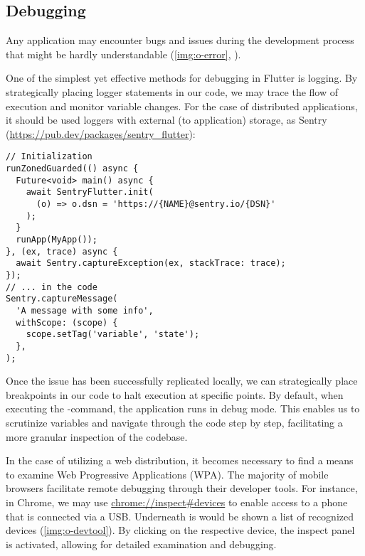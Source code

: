
\subsection{Debugging}

Any application may encounter bugs and issues during the development process that might be hardly understandable 
(\cref{img:o-error}, ).


\noindent One of the simplest yet effective methods for debugging in Flutter is logging. By strategically placing logger 
statements in our code, we may trace the flow of execution and monitor variable changes. For the case of distributed 
applications, it should be used loggers with external (to application) storage, as Sentry
(\href{https://pub.dev/packages/sentry\_flutter}{https://pub.dev/packages/sentry\_flutter}):

\begin{lstlisting}
// Initialization
runZonedGuarded(() async {
  Future<void> main() async {
    await SentryFlutter.init(
      (o) => o.dsn = 'https://{NAME}@sentry.io/{DSN}'
    );
  }
  runApp(MyApp());
}, (ex, trace) async {
  await Sentry.captureException(ex, stackTrace: trace);
});
// ... in the code
Sentry.captureMessage(
  'A message with some info',
  withScope: (scope) {
    scope.setTag('variable', 'state');
  },
);
\end{lstlisting}

\noindent Once the issue has been successfully replicated locally, we can strategically place breakpoints in our code 
to halt execution at specific points. By default, when executing the -command, the application runs in 
debug mode. This enables us to scrutinize variables and navigate through the code step by step, facilitating a more 
granular inspection of the codebase.

In the case of utilizing a web distribution, it becomes necessary to find a means to examine Web Progressive Applications 
(WPA). The majority of mobile browsers facilitate remote debugging through their developer tools. For instance, 
in Chrome, we may use \href{chrome://inspect\#devices}{chrome://inspect\#devices} to enable access to a phone that is 
connected via a USB. Underneath is would be shown a list of recognized devices (\cref{img:o-devtool}). By clicking on 
the respective device, the inspect panel is activated, allowing for detailed examination and debugging.

